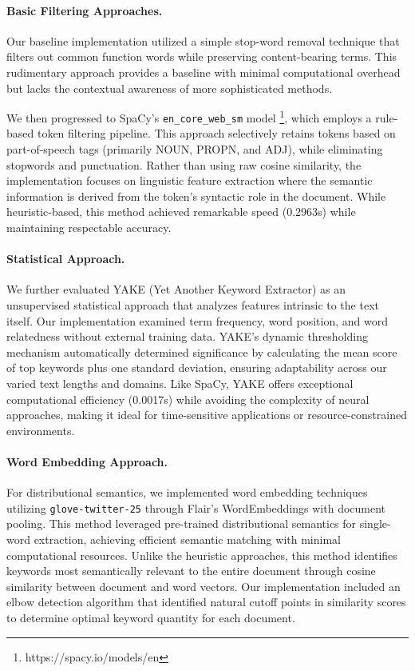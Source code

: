 \documentclass[sigconf]{acmart}
\begin{document}
\paragraph{Basic Filtering Approaches.}
Our baseline implementation utilized a simple stop-word removal technique that filters out common function words while preserving content-bearing terms. This rudimentary approach provides a baseline with minimal computational overhead but lacks the contextual awareness of more sophisticated methods. 

We then progressed to SpaCy's \texttt{en\_core\_web\_sm} model \footnote{https://spacy.io/models/en}, which employs a rule-based token filtering pipeline. This approach selectively retains tokens based on part-of-speech tags (primarily NOUN, PROPN, and ADJ), while eliminating stopwords and punctuation. Rather than using raw cosine similarity, the implementation focuses on linguistic feature extraction where the semantic information is derived from the token's syntactic role in the document. While heuristic-based, this method achieved remarkable speed (0.2963s) while maintaining respectable accuracy.

\paragraph{Statistical Approach.}
We further evaluated YAKE (Yet Another Keyword Extractor) \cite{DBLP:conf/ecir/0001MPJNJ18a} as an unsupervised statistical approach that analyzes features intrinsic to the text itself. Our implementation examined term frequency, word position, and word relatedness without external training data. YAKE's dynamic thresholding mechanism automatically determined significance by calculating the mean score of top keywords plus one standard deviation, ensuring adaptability across our varied text lengths and domains. Like SpaCy, YAKE offers exceptional computational efficiency (0.0017s) while avoiding the complexity of neural approaches, making it ideal for time-sensitive applications or resource-constrained environments.

\paragraph{Word Embedding Approach.}
For distributional semantics, we implemented word embedding techniques utilizing \texttt{glove-twitter-25} \cite{pennington2014glove} through Flair's \cite{akbik2019flair} WordEmbeddings with document pooling. This method leveraged pre-trained distributional semantics for single-word extraction, achieving efficient semantic matching with minimal computational resources. Unlike the heuristic approaches, this method identifies keywords most semantically relevant to the entire document through cosine similarity between document and word vectors. Our implementation included an elbow detection algorithm that identified natural cutoff points in similarity scores to determine optimal keyword quantity for each document.
\end{document}
